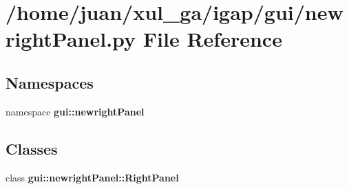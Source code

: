 \section{/home/juan/xul\_\-ga/igap/gui/newrightPanel.py File Reference}
\label{newrightPanel_8py}
\subsection*{Namespaces}
\begin{CompactItemize}
\item 
namespace {\bf gui::newrightPanel}
\end{CompactItemize}
\subsection*{Classes}
\begin{CompactItemize}
\item 
class {\bf gui::newrightPanel::RightPanel}
\end{CompactItemize}
